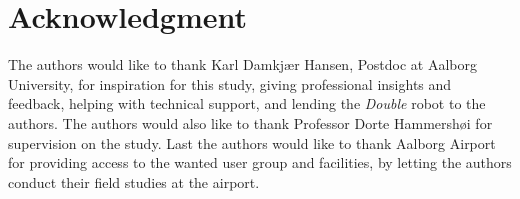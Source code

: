 \section*{Acknowledgment}
\label{Acknowledgment}
%
The authors would like to thank Karl Damkjær Hansen, Postdoc at Aalborg University, for inspiration for this study, giving professional insights and feedback, helping with technical support, and lending the \textit{Double} robot to the authors.
The authors would also like to thank Professor Dorte Hammershøi for supervision on the study. 
Last the authors would like to thank Aalborg Airport for providing access to the wanted user group and facilities, by letting the authors conduct their field studies at the airport. 